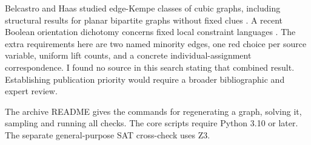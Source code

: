 \documentclass[12pt,letterpaper]{article}
\newcommand{\sh}[1]{\par\smallskip{\bfseries\color{ink}#1}\quad}
\begin{document}
Belcastro and Haas studied edge-Kempe classes of cubic graphs, including structural results for planar bipartite graphs without fixed clues \cite{bh}. A recent Boolean orientation dichotomy concerns fixed local constraint languages \cite{eo}. The extra requirements here are two named minority edges, one red choice per source variable, uniform lift counts, and a concrete individual-assignment correspondence. I found no source in this search stating that combined result. Establishing publication priority would require a broader bibliographic and expert review.

\sh{Replication.}
The archive README gives the commands for regenerating a graph, solving it, sampling and running all checks. The core scripts require Python 3.10 or later. The separate general-purpose SAT cross-check uses Z3.
\end{document}
